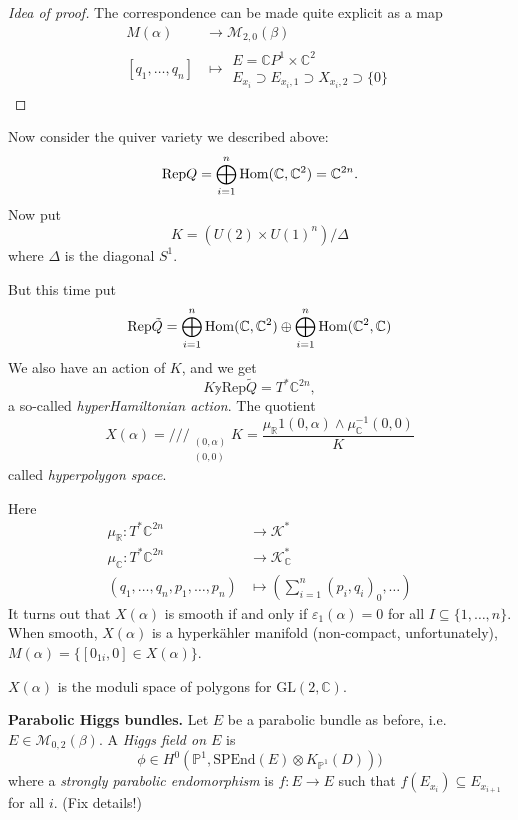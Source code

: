 \begin{proof}[Idea of proof]
The correspondence can be made quite explicit
as a map
\begin{align*}
M(\alpha) &\longrightarrow \mathcal{M}_{2,0}(\beta) \\
[q_1,\ldots,q_n] &\longmapsto \substack{E=\mathbb{C}P^{1}\times\mathbb{C}^2
 \\ E_{x_i}\supset E_{x_i,1}\supset X_{x_i,2}\supset \{0\}}\end{align*}

\end{proof}

\medskip\noindent
Now consider the quiver variety we described above:
$$
\text{Rep}Q=\bigoplus_{i=1}^n \mathop{\mathrm{Hom}}\nolimits(\mathbb{C},\mathbb{C}^2)=\mathbb{C}^{2n}.
$$
Now put
$$
K=(U(2) \times U(1)^n)/\Delta
$$
where $\Delta$ is the diagonal $S^1$.

But this time put
$$
\text{Rep}\tilde{Q}=\bigoplus_{i=1}^n \mathop{\mathrm{Hom}}\nolimits(\mathbb{C},\mathbb{C}^2)
\oplus \bigoplus_{i=1}^n \mathop{\mathrm{Hom}}\nolimits(\mathbb{C}^2,\mathbb{C})
$$
We also have an action of $K$, and we get
$$
K \mathbb{y} \text{Rep}\tilde{Q} = T^*  \mathbb{C}^{2n},
$$
a so-called {\it hyperHamiltonian action}.
The quotient
$$
X(\alpha)=/\!/\!/_{\substack{(0,\alpha) \\ (0,0)}}K=
\frac{\mu_{\mathbb{R}}1(0,\alpha) \wedge \mu^{-1}_{\mathbb{C}}(0,0)}{K}
$$
called {\it hyperpolygon space}.

Here
\begin{align*}
\mu_\mathbb{R}:T^*\mathbb{C}^{2n}&\to \mathcal{K}^* \\
\mu_{\mathbb{C}}:T^*\mathbb{C}^{2n}&  \to \mathcal{K}_{\mathbb{C}}^* \\
(q_1,\ldots,q_n,p_1,\ldots,p_n)&  \mapsto 
(\sum_{i=1}^n(p_i,q_i)_0,\ldots)
\end{align*}
It turns out that $X(\alpha)$ is smooth
if and only if $\varepsilon_1(\alpha)=0$ for all
$I \subseteq \{ 1,\ldots,n\}$.
When smooth,  $X(\alpha)$ is a hyperkähler manifold
(non-compact, unfortunately),
$M(\alpha)=\{[0_{1i},0] \in X(\alpha)\}$.

\begin{theorem}[Boalch]
\label{theorem-Boalch}
$X(\alpha)$ is the moduli space of polygons for $\text{GL}(2,\mathbb{C})$.
\end{theorem}

\medskip\noindent
{\bf Parabolic Higgs bundles.}
Let $E$ be a parabolic bundle as before, i.e.
$E \in \mathcal{M}_{0,2}(\beta)$.
A {\it Higgs field on $E$} is
$$
\phi \in H^{0}(\mathbb{P}^1,\text{SPEnd}(E) \otimes K_{\mathbb{P}^1}(D)))
$$
where a {\it strongly parabolic endomorphism} is  $f:E \to E$
such that $f(E_{x_i})\subseteq E_{x_{i+1}}$ for all $i$.
(Fix details!)

